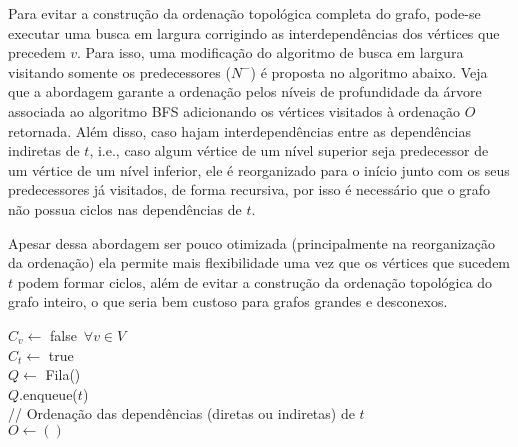 \documentclass[a4paper]{report}
\begin{document}

Para evitar a construção da ordenação topológica completa do grafo, pode-se executar uma busca em largura corrigindo as interdependências dos vértices que precedem $v$. Para isso, uma modificação do algoritmo de busca em largura visitando somente os predecessores ($N^{-}$) é proposta no algoritmo abaixo. Veja que a abordagem garante a ordenação pelos níveis de profundidade da árvore associada ao algoritmo BFS adicionando os vértices visitados à ordenação $O$ retornada. Além disso, caso hajam interdependências entre as dependências indiretas de $t$, i.e., caso algum vértice de um nível superior seja predecessor de um vértice de um nível inferior, ele é reorganizado para o início junto com os seus predecessores já visitados, de forma recursiva, por isso é necessário que o grafo não possua ciclos nas dependências de $t$.

Apesar dessa abordagem ser pouco otimizada (principalmente na reorganização da ordenação) ela permite mais flexibilidade uma vez que os vértices que sucedem $t$ podem formar ciclos, além de evitar a construção da ordenação topológica do grafo inteiro, o que seria bem custoso para grafos grandes e desconexos.

\begin{algorithm}[H]
    $C_v \gets  $ false $\, \forall v\in V$ \\
    $C_t\gets $ true \\
    $Q\gets $ Fila()\\
    $Q$.enqueue($t$) \\

    // Ordenação das dependências (diretas ou indiretas) de $t$ \\
    $O \gets \left(  \right) $


\end{algorithm}
\end{document}
